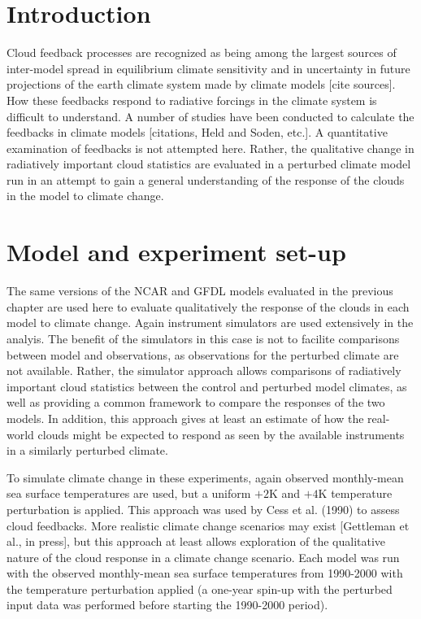 \section{Introduction}
Cloud feedback processes are recognized as being among the largest sources of inter-model spread in equilibrium climate sensitivity and in uncertainty in future projections of the earth climate system made by climate models [cite sources]. How these feedbacks respond to radiative forcings in the climate system is difficult to understand. A number of studies have been conducted to calculate the feedbacks in climate models [citations, Held and Soden, etc.]. A quantitative examination of feedbacks is not attempted here. Rather, the qualitative change in radiatively important cloud statistics are evaluated in a perturbed climate model run in an attempt to gain a general understanding of the response of the clouds in the model to climate change.

\section{Model and experiment set-up}
The same versions of the NCAR and GFDL models evaluated in the previous chapter are used here to evaluate qualitatively the response of the clouds in each model to climate change. Again instrument simulators are used extensively in the analyis. The benefit of the simulators in this case is not to facilite comparisons between model and observations, as observations for the perturbed climate are not available. Rather, the simulator approach allows comparisons of radiatively important cloud statistics between the control and perturbed model climates, as well as providing a common framework to compare the responses of the two models. In addition, this approach gives at least an estimate of how the real-world clouds might be expected to respond as seen by the available instruments in a similarly perturbed climate.

To simulate climate change in these experiments, again observed monthly-mean sea surface temperatures are used, but a uniform $+2$K and $+4$K temperature perturbation is applied. This approach was used by Cess et al. (1990) \cite{cess_et_al_1990} to assess cloud feedbacks. More realistic climate change scenarios may exist [Gettleman et al., in press], but this approach at least allows exploration of the qualitative nature of the cloud response in a climate change scenario. Each model was run with the observed monthly-mean sea surface temperatures from 1990-2000 with the temperature perturbation applied (a one-year spin-up with the perturbed input data was performed before starting the 1990-2000 period).

